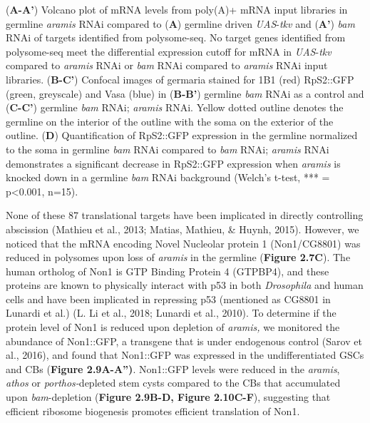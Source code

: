 \documentclass[12pt,oneside]{reedthesis}
\begin{document}
\setlength\parindent{0pt}(\textbf{A-A'}) Volcano plot of mRNA levels from poly(A)+ mRNA input libraries in germline \emph{aramis} RNAi compared to (\textbf{A}) germline driven \emph{UAS}-\emph{tkv} and (\textbf{A'}) \emph{bam} RNAi of targets identified from polysome-seq. No target genes identified from polysome-seq meet the differential expression cutoff for mRNA in \emph{UAS}-\emph{tkv} compared to \emph{aramis} RNAi or \emph{bam} RNAi compared to \emph{aramis} RNAi input libraries. (\textbf{B-C'}) Confocal images of germaria stained for 1B1 (red) RpS2::GFP (green, greyscale) and Vasa (blue) in (\textbf{B-B'}) germline \emph{bam} RNAi as a control and (\textbf{C-C'}) germline \emph{bam} RNAi; \emph{aramis} RNAi. Yellow dotted outline denotes the germline on the interior of the outline with the soma on the exterior of the outline. (\textbf{D}) Quantification of RpS2::GFP expression in the germline normalized to the soma in germline \emph{bam} RNAi compared to \emph{bam} RNAi; \emph{aramis} RNAi demonstrates a significant decrease in RpS2::GFP expression when \emph{aramis} is knocked down in a germline \emph{bam} RNAi background (Welch's t-test, *** = p\textless0.001, n=15).

\setlength\parindent{24pt}

\textbf{\hfill\break
}

None of these 87 translational targets have been implicated in directly controlling abscission (Mathieu et al., 2013; Matias, Mathieu, \& Huynh, 2015). However, we noticed that the mRNA encoding Novel Nucleolar protein 1 (Non1/CG8801) was reduced in polysomes upon loss of \emph{aramis} in the germline (\textbf{Figure 2.7C}). The human ortholog of Non1 is GTP Binding Protein 4 (GTPBP4), and these proteins are known to physically interact with p53 in both \emph{Drosophila} and human cells and have been implicated in repressing p53 (mentioned as CG8801 in Lunardi et al.) (L. Li et al., 2018; Lunardi et al., 2010). To determine if the protein level of Non1 is reduced upon depletion of \emph{aramis,} we monitored the abundance of Non1::GFP, a transgene that is under endogenous control (Sarov et al., 2016), and found that Non1::GFP was expressed in the undifferentiated GSCs and CBs (\textbf{Figure 2.9A-A'')}. Non1::GFP levels were reduced in the \emph{aramis}, \emph{athos} or \emph{porthos-}depleted stem cysts compared to the CBs that accumulated upon \emph{bam}-depletion (\textbf{Figure 2.9B-D, Figure 2.10C-F}), suggesting that efficient ribosome biogenesis promotes efficient translation of Non1.
\end{document}
